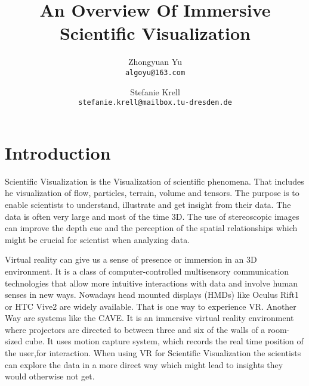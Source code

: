 \documentclass[10pt,twocolumn,letterpaper]{article}
\begin{document}
\title{An Overview Of Immersive Scientific Visualization}

\author{Zhongyuan Yu\\
{\tt\small algoyu@163.com}
\and
Stefanie Krell\\
{\tt\small stefanie.krell@mailbox.tu-dresden.de}
}

\maketitle


\section{Introduction}

Scientific Visualization is the Visualization of scientific phenomena. That includes he visualization of flow, particles, terrain, volume and tensors. The purpose is to enable scientists to understand, illustrate and get insight from their data. The data is often very large and most of the time 3D.  The use of stereoscopic images can improve the depth cue and the perception of the spatial relationships which might be crucial for scientist when analyzing data.


\setlength{\parindent}{1pc}
Virtual reality can give us a sense of presence or immersion in an 3D environment. It is a class of computer-controlled multisensory communication technologies that allow more intuitive interactions with data and involve human senses in new ways. Nowadays head mounted displays
(HMDs) like Oculus Rift1 or HTC Vive2 are widely available. That is one way to experience VR. Another Way are systems like the CAVE. It is an immersive virtual reality environment where projectors are directed to between three and six of the walls of a room-sized cube. It uses motion capture system, which records the real time position of the user,for interaction. When using VR for Scientific Visualization the scientists can explore the data in a more direct way which might lead to insights they would otherwise not get. 
\end{document}
